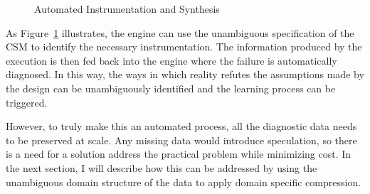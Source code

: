 \begin{figure}[htbp]
    \centering
    
    \caption{Automated Instrumentation and Synthesis}
    \label{fig:csm_instrumentation}
\end{figure}

As Figure~\ref{fig:csm_instrumentation} illustrates, the engine can use the unambiguous specification of the CSM to identify the necessary instrumentation. The information produced by the execution is then fed back into the engine where the failure is automatically diagnosed. In this way, the ways in which reality refutes the assumptions made by the design can be unambiguously identified and the learning process can be triggered.

However, to truly make this an automated process, all the diagnostic data needs to be preserved at scale. Any missing data would introduce speculation, so there is a need for a solution address the practical problem while minimizing cost. In the next section, I will describe how this can be addressed by using the unambiguous domain structure of the data to apply domain specific compression.